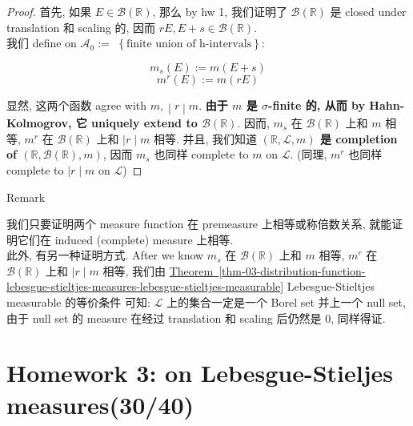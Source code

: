 \documentclass{qlnotes-export}
\begin{document}
\begin{proof}

首先, 如果 \(E \in \mathcal{B}({\mathbb{R}})\), 那么 by hw 1, 我们证明了 \(\mathcal{B}({\mathbb{R}})\) 是 closed under translation 和 scaling 的, 因而 \(rE,E + s \in \mathcal{B}({\mathbb{R}})\).\\
我们 define on \(\mathcal{A}_{0} :=\) \(\left\{ \text{finite union of h-intervals} \right\}\):

\[m_{s}(E) := m(E + s)\]\[m^{r}(E) := m(rE)\]

显然, 这两个函数 agree with \(\left. m, \middle| r \middle| m \right.\). \textbf{由于 \(m\) 是 \(\sigma\)-finite 的, 从而 by Hahn-Kolmogrov, 它 uniquely extend to \(\mathcal{B}({\mathbb{R}})\)}. 因而, \(m_{s}\) 在 \(\mathcal{B}({\mathbb{R}})\) 上和 \(m\) 相等, \(m^{r}\) 在 \(\mathcal{B}({\mathbb{R}})\) 上和 \(\left. |r \middle| m \right.\) 相等. 并且, 我们知道 \textbf{\(({\mathbb{R}},\mathcal{L},m)\) 是 completion of \(({\mathbb{R}},\mathcal{B}({\mathbb{R}}),m)\)}, 因而 \(m_{s}\) 也同样 complete to \(m\) on \(\mathcal{L}\). (同理, \(m^{r}\) 也同样 complete to \(\left. |r \middle| m \right.\) on \(\mathcal{L}\))

\end{proof}

\begin{qlremark}{Remark}

我们只要证明两个 measure function 在 premeasure 上相等或称倍数关系, 就能证明它们在 induced (complete) measure 上相等.\\
此外, 有另一种证明方式. After we know \(m_{s}\) 在 \(\mathcal{B}({\mathbb{R}})\) 上和 \(m\) 相等, \(m^{r}\) 在 \(\mathcal{B}({\mathbb{R}})\) 上和 \(\left. |r \middle| m \right.\) 相等, 我们由 \hyperref[thm-03-distribution-function-lebesgue-stieltjes-measures-lebesgue-stieltjes-measurable]{Theorem~\ref*{thm-03-distribution-function-lebesgue-stieltjes-measures-lebesgue-stieltjes-measurable}} Lebesgue-Stieltjes measurable 的等价条件 可知: \(\mathcal{L}\) 上的集合一定是一个 Borel set 并上一个 null set, 由于 null set 的 measure 在经过 translation 和 scaling 后仍然是 0, 同样得证.

\end{qlremark}

\chapter{Homework 3: on Lebesgue-Stieljes measures(30/40)}\label{homework-3-on-lebesgue-stieljes-measures3040}
\end{document}
